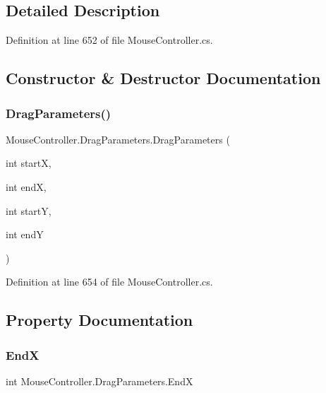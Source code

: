 \subsection{Detailed Description}


Definition at line 652 of file Mouse\+Controller.\+cs.



\subsection{Constructor \& Destructor Documentation}
\mbox{\label{class_mouse_controller_1_1_drag_parameters_a2e6a08c9135e303d430b7b0c8d8c9a9d}} 
\subsubsection{\texorpdfstring{Drag\+Parameters()}{DragParameters()}}
{\footnotesize\ttfamily Mouse\+Controller.\+Drag\+Parameters.\+Drag\+Parameters (\begin{DoxyParamCaption}\item[{int}]{startX,  }\item[{int}]{endX,  }\item[{int}]{startY,  }\item[{int}]{endY }\end{DoxyParamCaption})}



Definition at line 654 of file Mouse\+Controller.\+cs.



\subsection{Property Documentation}
\mbox{\label{class_mouse_controller_1_1_drag_parameters_ab9d8d0a036421e59f26fd0c7154aa42e}} 
\subsubsection{\texorpdfstring{EndX}{EndX}}
{\footnotesize\ttfamily int Mouse\+Controller.\+Drag\+Parameters.\+EndX\hspace{0.3cm}{\ttfamily [get]}}



